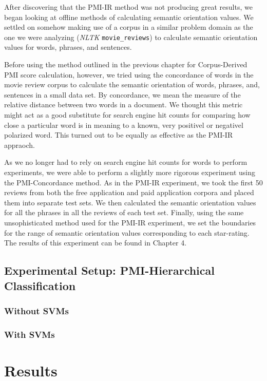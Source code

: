 \documentclass[11pt]{report} %
\begin{document}
After discovering that the PMI-IR method was not producing great results, we began looking at offline methods of calculating semantic orientation values. We settled on somehow making use of a corpus in a similar problem domain as the one we were analyzing (\textit{NLTK} \verb|movie_reviews|) to calculate semantic orientation values for words, phrases, and sentences. 

Before using the method outlined in the previous chapter for Corpus-Derived PMI score calculation, however, we tried using the concordance of words in the movie review corpus to calculate the semantic orientation of words, phrases, and, sentences in a small data set. By concordance, we mean the measure of the relative distance between two words in a document. We thought this metric might act as a good substitute for search engine hit counts for comparing how close a particular word is in meaning to a known, very positivel or negativel polarized word. This turned out to be equally as effective as the PMI-IR appraoch.

As we no longer had to rely on search engine hit counts for words to perform experiments, we were able to perform a slightly more rigorous experiment using the PMI-Concordance method. As in the PMI-IR experiment, we took the first 50 reviews from both the free application and paid application corpora and placed them into separate test sets. We then calculated the semantic orientation values for all the phrases in all the reviews of each test set. Finally, using the same unsophisticated method used for the PMI-IR experiment, we set the boundaries for the range of semantic orientation values corresponding to each star-rating. The results of this experiment can be found in Chapter 4. 

\section{Experimental Setup: PMI-Hierarchical Classification}
	\subsection{Without SVMs}
	\subsection{With SVMs}



\chapter{Results}
\label{chapter:results}
\end{document}
